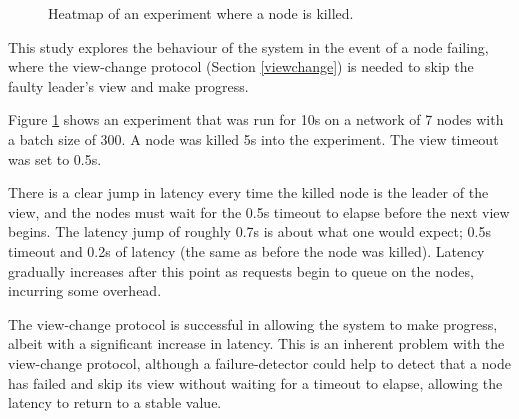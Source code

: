 \begin{figure}[h!]
\centering
\resizebox{\textwidth}{!}{}
\caption{Heatmap of an experiment where a node is killed.}
\label{viewchangeheatmap}
\end{figure}

This study explores the behaviour of the system in the event of a node failing, where the view-change protocol (Section \ref{viewchange}) is needed to skip the faulty leader's view and make progress.

Figure \ref{viewchangeheatmap} shows an experiment that was run for 10s on a network of 7 nodes with a batch size of 300. A node was killed 5s into the experiment. The view timeout was set to 0.5s.

There is a clear jump in latency every time the killed node is the leader of the view, and the nodes must wait for the 0.5s timeout to elapse before the next view begins. The latency jump of roughly 0.7s is about what one would expect; 0.5s timeout and 0.2s of latency (the same as before the node was killed). Latency gradually increases after this point as requests begin to queue on the nodes, incurring some overhead.

The view-change protocol is successful in allowing the system to make progress, albeit with a significant increase in latency. This is an inherent problem with the view-change protocol, although a failure-detector could help to detect that a node has failed and skip its view without waiting for a timeout to elapse, allowing the latency to return to a stable value.









